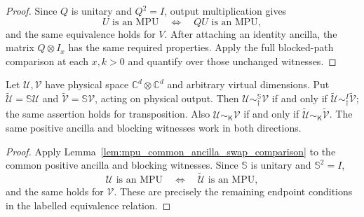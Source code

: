 \begin{proof}\leanok
    Since $Q$ is unitary and $Q^2=I$, output multiplication gives
    \[
        U\text{ is an MPU}\quad\Longleftrightarrow\quad
        QU\text{ is an MPU},
    \]
    and the same equivalence holds for $V$. After attaching an identity
    ancilla, the matrix $Q\otimes I_x$ has the same required properties.
    Apply the full blocked-path comparison at each $x,k>0$ and quantify
    over those unchanged witnesses.
\end{proof}

\begin{lemma}
    \label{thm:mpu_labelled_swap_equivalence}
    \leanok
    Let $\mathcal U,\mathcal V$ have physical space
    $\mathbb C^d\otimes\mathbb C^d$ and arbitrary virtual dimensions.
    Put $\widetilde{\mathcal U}=\mathbb S\mathcal U$ and
    $\widetilde{\mathcal V}=\mathbb S\mathcal V$, acting on physical output.
    Then $\mathcal U\sim^{\mathbb S}_{\dagger}\mathcal V$ if and only if
    $\widetilde{\mathcal U}\sim^{I}_{\dagger}\widetilde{\mathcal V}$;
    the same assertion holds for transposition. Also
    $\mathcal U\sim_{\mathsf K}\mathcal V$ if and only if
    $\widetilde{\mathcal U}\sim_{\mathsf K}\widetilde{\mathcal V}$.
    The same positive ancilla and blocking witnesses work in both directions.
\end{lemma}

\begin{proof}\leanok
    Apply Lemma~\ref{lem:mpu_common_ancilla_swap_comparison} to the
    common positive ancilla and blocking witnesses. Since
    $\mathbb S$ is unitary and $\mathbb S^2=I$,
    \[
        \mathcal U\text{ is an MPU}\quad\Longleftrightarrow\quad
        \widetilde{\mathcal U}\text{ is an MPU},
    \]
    and the same holds for $\mathcal V$. These are precisely the remaining
    endpoint conditions in the labelled equivalence relation.
\end{proof}

